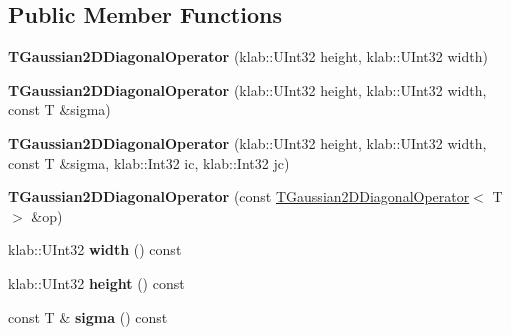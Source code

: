 \subsection*{Public Member Functions}
\begin{DoxyCompactItemize}
\item 
{\bfseries T\+Gaussian2\+D\+Diagonal\+Operator} (klab\+::\+U\+Int32 height, klab\+::\+U\+Int32 width)\hypertarget{classkl1p_1_1TGaussian2DDiagonalOperator_a47969ffab3aab03fb66a28dda0226526}{}\label{classkl1p_1_1TGaussian2DDiagonalOperator_a47969ffab3aab03fb66a28dda0226526}

\item 
{\bfseries T\+Gaussian2\+D\+Diagonal\+Operator} (klab\+::\+U\+Int32 height, klab\+::\+U\+Int32 width, const T \&sigma)\hypertarget{classkl1p_1_1TGaussian2DDiagonalOperator_a34982072d8ebfa327bb76d8fe1588fe7}{}\label{classkl1p_1_1TGaussian2DDiagonalOperator_a34982072d8ebfa327bb76d8fe1588fe7}

\item 
{\bfseries T\+Gaussian2\+D\+Diagonal\+Operator} (klab\+::\+U\+Int32 height, klab\+::\+U\+Int32 width, const T \&sigma, klab\+::\+Int32 ic, klab\+::\+Int32 jc)\hypertarget{classkl1p_1_1TGaussian2DDiagonalOperator_ab332c84617d8df607d5cfa6ff435801e}{}\label{classkl1p_1_1TGaussian2DDiagonalOperator_ab332c84617d8df607d5cfa6ff435801e}

\item 
{\bfseries T\+Gaussian2\+D\+Diagonal\+Operator} (const \hyperlink{classkl1p_1_1TGaussian2DDiagonalOperator}{T\+Gaussian2\+D\+Diagonal\+Operator}$<$ T $>$ \&op)\hypertarget{classkl1p_1_1TGaussian2DDiagonalOperator_aef45ac6c473e95655f3aedf58e0fcc51}{}\label{classkl1p_1_1TGaussian2DDiagonalOperator_aef45ac6c473e95655f3aedf58e0fcc51}

\item 
klab\+::\+U\+Int32 {\bfseries width} () const \hypertarget{classkl1p_1_1TGaussian2DDiagonalOperator_a858ffa3571b73fd6b89331da02a44ce7}{}\label{classkl1p_1_1TGaussian2DDiagonalOperator_a858ffa3571b73fd6b89331da02a44ce7}

\item 
klab\+::\+U\+Int32 {\bfseries height} () const \hypertarget{classkl1p_1_1TGaussian2DDiagonalOperator_ae03846d27549fc22264b7eee2092ab35}{}\label{classkl1p_1_1TGaussian2DDiagonalOperator_ae03846d27549fc22264b7eee2092ab35}

\item 
const T \& {\bfseries sigma} () const \hypertarget{classkl1p_1_1TGaussian2DDiagonalOperator_a206603bbc13aa9e794367b2bf2d90f19}{}\label{classkl1p_1_1TGaussian2DDiagonalOperator_a206603bbc13aa9e794367b2bf2d90f19}


\end{DoxyCompactItemize}
